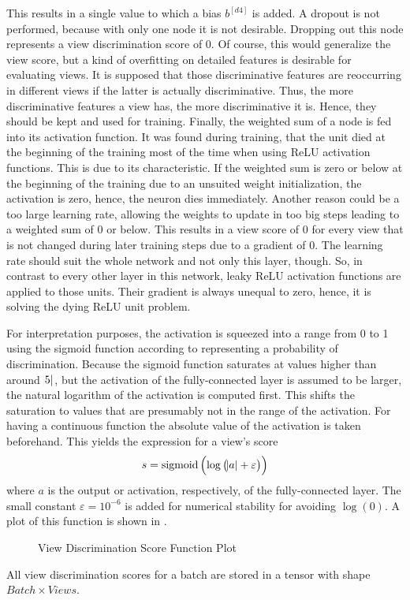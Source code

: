 This results in a single value to which a bias $b^{[d4]}$ is added.
A dropout is not performed, because with only one node it is not desirable.
Dropping out this node represents a view discrimination score of 0.
Of course, this would generalize the view score, but a kind of overfitting on detailed features is desirable for evaluating views.
It is supposed that those discriminative features are reoccurring in different views if the latter is actually discriminative.
Thus, the more discriminative features a view has, the more discriminative it is.
Hence, they should be kept and used for training.
Finally, the weighted sum of a node is fed into its activation function.
It was found during training, that the unit died at the beginning of the training most of the time when using ReLU activation functions.
This is due to its characteristic.
If the weighted sum is zero or below at the beginning of the training due to an unsuited weight initialization, the activation is zero, hence, the neuron dies immediately.
Another reason could be a too large learning rate, allowing the weights to update in too big steps leading to a weighted sum of 0 or below.
This results in a view score of $0$ for every view that is not changed during later training steps due to a gradient of 0.
The learning rate should suit the whole network and not only this layer, though.
So, in contrast to every other layer in this network, leaky ReLU activation functions are applied to those units.
Their gradient is always unequal to zero, hence, it is solving the dying ReLU unit problem.

For interpretation purposes, the activation is squeezed into a range from 0 to 1 using the sigmoid function according to \cite{Feng2018} representing a probability of discrimination.
Because the sigmoid function saturates at values higher than around $\abs{5}$, but the activation of the fully-connected layer is assumed to be larger, the natural logarithm of the activation is computed first.
This shifts the saturation to values that are presumably not in the range of the activation.
For having a continuous function the absolute value of the activation is taken beforehand.
This yields the expression for a view's score
\begin{equation}
	\label{eq:view-discrimination-score}
	s = \operatorname{sigmoid}\left( \log \left( \abs{a} + \varepsilon \right) \right)
\end{equation}
where $a$ is the output or activation, respectively, of the fully-connected layer.
The small constant $\varepsilon=10^{-6}$ is added for numerical stability for avoiding $\log(0)$.
A plot of this function is shown in .
\begin{figure}
	\setlength{}
	\setlength{}
	\centering
	
	\caption{View Discrimination Score Function Plot}
	\label{fig:view-discrimination-score}
\end{figure}
All view discrimination scores for a batch are stored in a tensor with shape $Batch \times Views$.

